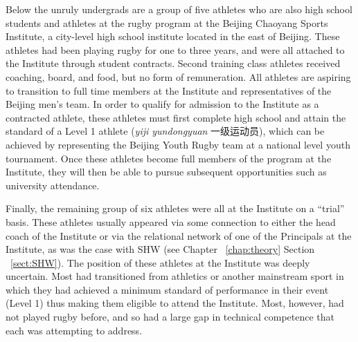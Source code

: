 \begin{CJK}{UTF8}{gbsn}

Below the unruly undergrads are a group of five athletes who are also high school students and athletes at the rugby program at the Beijing Chaoyang Sports Institute, a city-level high school institute located in the east of Beijing.  These athletes had been playing rugby for one to three years, and were all attached to the Institute through student contracts.  Second training class athletes received coaching, board, and food, but no form of remuneration.  All athletes are aspiring to transition to full time members at the Institute and representatives of the Beijing men's team.  In order to qualify for admission to the Institute as a contracted athlete, these athletes must first complete high school and attain the standard of a Level 1 athlete (\textit{yiji yundongyuan} 一级运动员), which can be achieved by representing the Beijing Youth Rugby team at a national level youth tournament.  Once these athletes become full members of the program at the Institute, they will then be able to pursue subsequent opportunities such as university attendance.

Finally, the remaining group of six athletes were all at the Institute on a ``trial'' basis.  These athletes usually appeared via some connection to either the head coach of the Institute or via the relational network of one of the Principals at the Institute, as was the case with SHW (see Chapter ~\ref{chap:theory} Section ~\ref{sect:SHW}). The position of these athletes at the Institute was deeply uncertain.  Most had transitioned from athletics or another mainstream sport in which they had achieved a minimum standard of performance in their event (Level 1) thus making them eligible to attend the Institute.  Most, however, had not played rugby before, and so had a large gap in technical competence that each was attempting to address.





\end{CJK}
